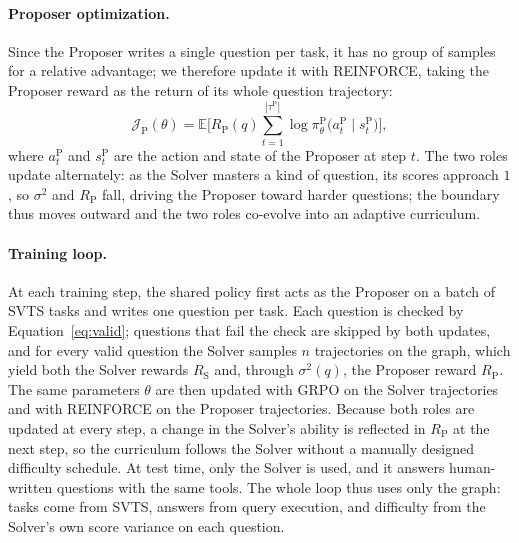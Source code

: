 
\paragraph{Proposer optimization.}
Since the Proposer writes a single question per task, it has no group of samples for a relative advantage; we therefore update it with REINFORCE, taking the Proposer reward as the return of its whole question trajectory:
\begin{equation}
\label{eq:reinforce}
\mathcal{J}_{\mathrm{P}}(\theta)=\mathbb{E}\!\Bigg[
R_{\mathrm{P}}(q)\sum_{t=1}^{|\tau^{\mathrm{P}}|}
\log\pi_\theta^{\mathrm{P}}\!\bigl(a^{\mathrm{P}}_{t}\mid s^{\mathrm{P}}_{t}\bigr)
\Bigg],
\end{equation}
where $a^{\mathrm{P}}_{t}$ and $s^{\mathrm{P}}_{t}$ are the action and state of the Proposer at step $t$. The two roles update alternately: as the Solver masters a kind of question, its scores approach $1$, so $\sigma^{2}$ and $R_{\mathrm{P}}$ fall, driving the Proposer toward harder questions; the boundary thus moves outward and the two roles co-evolve into an adaptive curriculum.

\paragraph{Training loop.}
At each training step, the shared policy first acts as the Proposer on a batch of SVTS tasks and writes one question per task. Each question is checked by Equation~\ref{eq:valid}; questions that fail the check are skipped by both updates, and for every valid question the Solver samples $n$ trajectories on the graph, which yield both the Solver rewards $R_{\mathrm{S}}$ and, through $\sigma^{2}(q)$, the Proposer reward $R_{\mathrm{P}}$. The same parameters $\theta$ are then updated with GRPO on the Solver trajectories and with REINFORCE on the Proposer trajectories. Because both roles are updated at every step, a change in the Solver's ability is reflected in $R_{\mathrm{P}}$ at the next step, so the curriculum follows the Solver without a manually designed difficulty schedule. At test time, only the Solver is used, and it answers human-written questions with the same tools. The whole loop thus uses only the graph: tasks come from SVTS, answers from query execution, and difficulty from the Solver's own score variance on each question.

